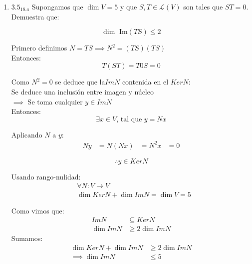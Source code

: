 \documentclass{article}
\begin{document}
		\begin{enumerate}
			
			
			\item[] \(3.5_{18.a}\) Supongamos que \(\dim V=5\) y que \(S,T \in \mathscr{L}(V)\) son tales que \(ST=0\). Demuestra que:
			
			\begin{equation*}
				\dim\text{ Im}(TS) \leq 2
			\end{equation*}
			
			Primero definimos \(N=TS \implies N^2=(TS)(TS)\) \\
			
			Entonces: \\
			\begin{equation*}
				T(ST) = T0S = 0 
			\end{equation*}
			
			Como \(N^2=0\) se deduce que la\(Im N\) contenida en el \(Ker N\):\\
			Se deduce una inclusión entre imagen y núcleo \\
			\(\implies\) Se toma cualquier \(y\in Im N\) \\
			
			Entonces:
			\begin{equation*}
				\exists x \in V \text{, tal que } y =Nx
			\end{equation*}
			
			Aplicando \(N\) a \(y\): \\
			\begin{equation*}
				\begin{aligned}
					Ny &=N(Nx)
					   &=N^2x
					   &=0
				\end{aligned}
			\end{equation*}
			
			\[
			\boxed{\therefore y \in Ker N}
			\]
			
			Usando rango-nulidad:
			\begin{equation*}
				\begin{aligned}
					&\forall N:V \to V \\
					&\dim Ker N + \dim Im N=\dim V = 5
				\end{aligned}
			\end{equation*}
			
			Como vimos que:
			\begin{equation*}
				\begin{aligned}
					Im N &\subseteq Ker N \\
					\dim Im N &\geq 2 \dim Im N
				\end{aligned}
			\end{equation*} 
			Sumamos:
			\begin{equation*}
				\begin{aligned}
					\dim Ker N+\dim Im N &\geq 2 \dim Im N \\
					\implies \dim Im N& \leq 5
				\end{aligned}
			\end{equation*}
			

\end{enumerate}
\end{document}
